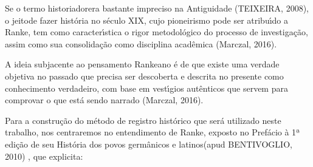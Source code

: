 \documentclass[
12pt,		%
openright,	%
twoside,  %
a4paper,			%
chapter=TITLE,		%
english,			%
french,				%
spanish,			%
brazil				%
]{USPSC-classe/USPSC}
\begin{document}
Se o termo \textquotedbl historiador\textquotedbl  era bastante impreciso na Antiguidade (TEIXEIRA, 2008), o \textquotedbl jeito\textquotedbl  de fazer hist\'oria no s\'eculo XIX, cujo pioneirismo pode ser atribu\'{\i}do a Ranke, tem como caracter\'{\i}stica \textquotedbl o rigor metodol\'ogico do processo de investiga\c{c}\~ao\textquotedbl , assim como sua consolida\c{c}\~ao como disciplina acad\^emica (Marczal, 2016).














A ideia subjacente ao pensamento Rankeano \'e de que existe uma verdade objetiva no passado que precisa ser descoberta e descrita no presente como \textquotedbl conhecimento verdadeiro\textquotedbl , com base em vest\'{\i}gios aut\^enticos que servem para comprovar o que est\'a sendo narrado (Marczal, 2016).














Para a constru\c{c}\~ao do m\'etodo de registro hist\'orico que ser\'a utilizado neste trabalho, nos centraremos no entendimento de Ranke, exposto no Pref\'acio \`a 1ª edi\c{c}\~ao de seu \textquotedbl Hist\'oria dos povos germ\^anicos e latinos\textquotedbl   (apud BENTIVOGLIO, 2010) , que explicita:















\noindent\begin{center}\mbox{\centering{}}\end{center}
\end{document}
